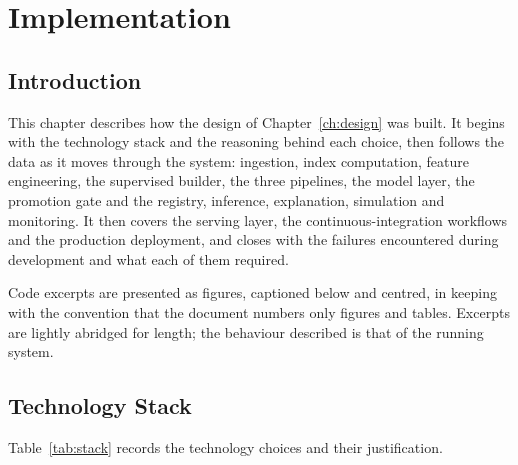 \chapter{Implementation}
\label{ch:impl}

\section{Introduction}
This chapter describes how the design of Chapter~\ref{ch:design} was built. It
begins with the technology stack and the reasoning behind each choice, then
follows the data as it moves through the system: ingestion, index computation,
feature engineering, the supervised builder, the three pipelines, the model
layer, the promotion gate and the registry, inference, explanation, simulation
and monitoring. It then covers the serving layer, the continuous-integration
workflows and the production deployment, and closes with the failures encountered
during development and what each of them required.

Code excerpts are presented as figures, captioned below and centred, in keeping
with the convention that the document numbers only figures and tables. Excerpts
are lightly abridged for length; the behaviour described is that of the running
system.

\section{Technology Stack}
Table~\ref{tab:stack} records the technology choices and their justification.

